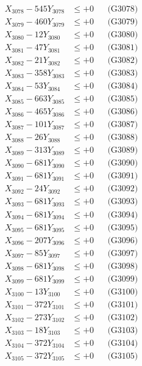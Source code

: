 \documentclass[a4paper,10pt]{article}
\begin{document}
{\begin{align}
X_{3078} - 545Y_{3078} &\leq +0 && \text{(G3078)} \\
X_{3079} - 460Y_{3079} &\leq +0 && \text{(G3079)} \\
X_{3080} - 12Y_{3080} &\leq +0 && \text{(G3080)} \\
\allowbreak
X_{3081} - 47Y_{3081} &\leq +0 && \text{(G3081)} \\
X_{3082} - 21Y_{3082} &\leq +0 && \text{(G3082)} \\
X_{3083} - 358Y_{3083} &\leq +0 && \text{(G3083)} \\
X_{3084} - 53Y_{3084} &\leq +0 && \text{(G3084)} \\
X_{3085} - 663Y_{3085} &\leq +0 && \text{(G3085)} \\
X_{3086} - 465Y_{3086} &\leq +0 && \text{(G3086)} \\
X_{3087} - 101Y_{3087} &\leq +0 && \text{(G3087)} \\
X_{3088} - 26Y_{3088} &\leq +0 && \text{(G3088)} \\
X_{3089} - 313Y_{3089} &\leq +0 && \text{(G3089)} \\
X_{3090} - 681Y_{3090} &\leq +0 && \text{(G3090)} \\
\allowbreak
X_{3091} - 681Y_{3091} &\leq +0 && \text{(G3091)} \\
X_{3092} - 24Y_{3092} &\leq +0 && \text{(G3092)} \\
X_{3093} - 681Y_{3093} &\leq +0 && \text{(G3093)} \\
X_{3094} - 681Y_{3094} &\leq +0 && \text{(G3094)} \\
X_{3095} - 681Y_{3095} &\leq +0 && \text{(G3095)} \\
X_{3096} - 207Y_{3096} &\leq +0 && \text{(G3096)} \\
X_{3097} - 85Y_{3097} &\leq +0 && \text{(G3097)} \\
X_{3098} - 681Y_{3098} &\leq +0 && \text{(G3098)} \\
X_{3099} - 681Y_{3099} &\leq +0 && \text{(G3099)} \\
X_{3100} - 13Y_{3100} &\leq +0 && \text{(G3100)} \\
\allowbreak
X_{3101} - 372Y_{3101} &\leq +0 && \text{(G3101)} \\
X_{3102} - 273Y_{3102} &\leq +0 && \text{(G3102)} \\
X_{3103} - 18Y_{3103} &\leq +0 && \text{(G3103)} \\
X_{3104} - 372Y_{3104} &\leq +0 && \text{(G3104)} \\
X_{3105} - 372Y_{3105} &\leq +0 && \text{(G3105)} \\

\end{align}}
\end{document}
